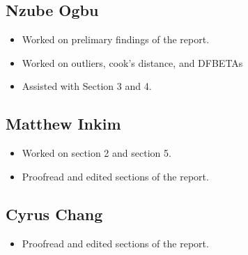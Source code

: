 \documentclass[letter]{article}
\begin{document}
\subsection{Nzube Ogbu}
\begin{itemize}
    \item Worked on prelimary findings of the report.
    \item Worked on outliers, cook's distance, and DFBETAs
    \item Assisted with Section 3 and 4.
\end{itemize}
\subsection{Matthew Inkim}
\begin{itemize}
    \item Worked on section 2 and section 5.
    \item Proofread and edited sections of the report.
\end{itemize}
\subsection{Cyrus Chang}
\begin{itemize}
    \item Proofread and edited sections of the report.
\end{itemize}
\end{document}
